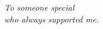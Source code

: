 
\thispagestyle{empty}


\begin{flushright}
 \foreignlanguage{english}{
  \textit{
   To someone special\\%
   who always supported me.%
  }
 } 
\end{flushright}

\null

\clearpage
